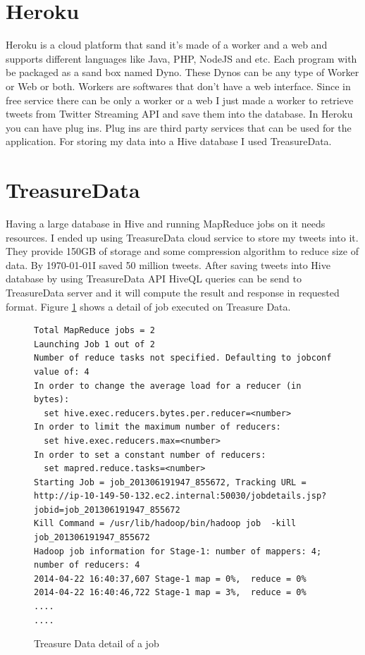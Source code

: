 \documentclass[a4paper,11pt]{report}
\begin{document}
\section{Heroku}

Heroku is a cloud platform that sand it's made of a worker and a web and supports different languages like Java, PHP, NodeJS and etc. Each program with be packaged as a sand box named Dyno. These Dynos can be any type of Worker or Web or both. Workers are softwares that don't have a web interface. Since in free service there can be only a worker or a web I just made a worker to retrieve tweets from Twitter Streaming API and save them into the database. In Heroku you can have plug ins. Plug ins are third party services that can be used for the application. For storing my data into a Hive database I used TreasureData.

\section{TreasureData}

Having a large database in Hive and running MapReduce jobs on it needs resources. I ended up using TreasureData cloud service to store my tweets into it. They provide 150GB of storage and some compression algorithm to reduce size of data. By \today I saved 50 million tweets. After saving tweets into Hive database by using TreasureData API HiveQL queries can be send to TreasureData server and it will compute the result and response in requested format. Figure \ref{fig:tddetail} shows a detail of job executed on Treasure Data.

\begin{figure}[!hbp]
\caption{Treasure Data detail of a job}
\begin{lstlisting}
Total MapReduce jobs = 2
Launching Job 1 out of 2
Number of reduce tasks not specified. Defaulting to jobconf value of: 4
In order to change the average load for a reducer (in bytes):
  set hive.exec.reducers.bytes.per.reducer=<number>
In order to limit the maximum number of reducers:
  set hive.exec.reducers.max=<number>
In order to set a constant number of reducers:
  set mapred.reduce.tasks=<number>
Starting Job = job_201306191947_855672, Tracking URL = http://ip-10-149-50-132.ec2.internal:50030/jobdetails.jsp?jobid=job_201306191947_855672
Kill Command = /usr/lib/hadoop/bin/hadoop job  -kill job_201306191947_855672
Hadoop job information for Stage-1: number of mappers: 4; number of reducers: 4
2014-04-22 16:40:37,607 Stage-1 map = 0%,  reduce = 0%
2014-04-22 16:40:46,722 Stage-1 map = 3%,  reduce = 0%
....
....
\end{lstlisting}
\label{fig:tddetail}
\end{figure}
\end{document}
